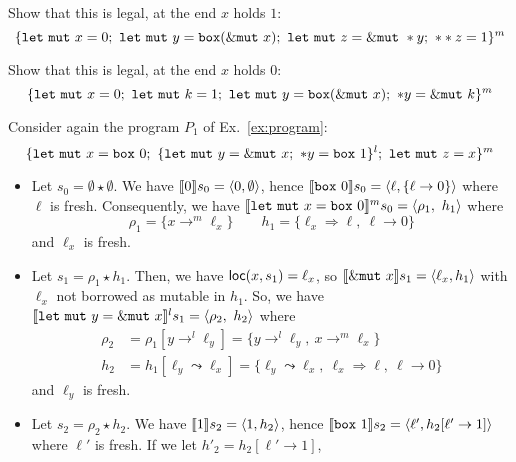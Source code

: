\begin{example}
  Show that this is legal, at the end $x$ holds $1$:
  \[
    \{
      \mathtt{let\ mut}\ x = 0;\
      \mathtt{let\ mut}\ y = \mathtt{box}(\mutborrow x);\
      \mathtt{let\ mut}\ z = \mutborrow *y;\
      **z = 1
    \}^m
  \]
\end{example}

\begin{example}
  Show that this is legal, at the end $x$ holds $0$:
  \[
    \{
    \mathtt{let\ mut}\ x = 0;\
    \mathtt{let\ mut}\ k = 1;\
    \mathtt{let\ mut}\ y = \mathtt{box}(\mutborrow x);\
    *y = \mutborrow k
    \}^m
  \]
\end{example}

\begin{example}
  Consider again the program $P_1$ of Ex.~\ref{ex:program}:
  \[
    \{
      \mathtt{let\ mut}\ x = \mathtt{box}\ 0;\
      \{\mathtt{let\ mut}\ y = \mutborrow x;\
      \mathtt{*}y = \mathtt{box}\ 1\}^l;\
      \mathtt{let\ mut}\ z = x
    \}^m
  \]
  \begin{itemize}
    \item Let $s_0=\emptyset \star \emptyset$.
    We have $\den[0]{s_0} = \langle 0,\emptyset\rangle$, hence
    $\den[\mathtt{box}\ 0]{s_0} =
    \langle\ell,\{\ell\to 0\}\rangle$ where $\ell$ is fresh.
    Consequently, we have
    $\denl[\mathtt{let\ mut}\ x = \mathtt{box}\ 0]{m}{s_0} =
    \langle \rho_1,\ h_1\rangle$ where
    \[\rho_1=\{x\to^m\ell_x\} \qquad
    h_1 = \{\ell_x\Rightarrow \ell,\ \ell\to 0\}\]
    and $\ell_x$ is fresh.
    \item Let $s_1 = \rho_1 \star h_1$.
    Then, we have $\loc(x,s_1) = \ell_x$, so
    $\den[\mutborrow x]{s_1} = \langle\ell_x, h_1\rangle$
    with $\ell_x$ not borrowed as mutable in $h_1$.
    So, we have
    $\denl[\mathtt{let\ mut}\ y = \mutborrow x]{l}{s_1} =
    \langle \rho_2,\ h_2\rangle$
    where
    \begin{align*}
      \rho_2 & = \rho_1[y\to^l\ell_y] = \{y\to^l\ell_y,\ x\to^m\ell_x\}\\
      h_2 & = h_1[\ell_y\leadsto \ell_x] =
      \{\ell_y\leadsto \ell_x,\ \ell_x\Rightarrow \ell,\ \ell\to 0\}
    \end{align*}
    and $\ell_y$ is fresh.
    \item Let $s_2 = \rho_2 \star h_2$.
    We have $\den[1]{s_2} = \langle 1,h_2\rangle$, hence
    $\den[\mathtt{box}\ 1]{s_2} =
    \langle\ell',h_2[\ell'\to 1]\rangle$ where $\ell'$ is fresh.
    If we let $h'_2 = h_2[\ell'\to 1]$,

\end{itemize}
\end{example}
